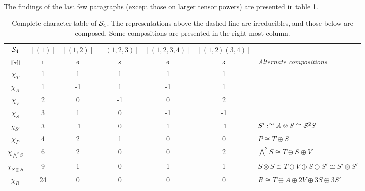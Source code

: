 \begin{example}
	\paragraph{} The findings of the last few paragraphs (except those on larger tensor powers) are presented in table \ref{table:completecharS4}.
	
	\begin{table}[hbt!]
		\centering
		\begin{tabular}{c | c c c c c | l}
			$\mathcal{S}_4$         & $[(1)]$   & $[(1,2)]$  & $[(1,2,3)]$ & $[(1,2,3,4)]$ & $[(1,2)(3,4)]$ &                                                              \\
			$\scriptstyle|[\sigma]|$    & $\scriptstyle 1$ & $\scriptstyle 6$ & $\scriptstyle 8$ & $\scriptstyle 6$  & $\scriptstyle 3$      & \textit{Alternate compositions}                              \\ \hline
			$\chi_T$       & 1       & 1       & 1       & 1        & 1            &                                                              \\
			$\chi_A$       & 1       & -1      & 1       & -1       & 1            &                                                              \\
			$\chi_V$       & 2       & 0       & -1      & 0        & 2            &                                                              \\
			$\chi_S$       & 3       & 1       & 0       & -1       & -1           &                                                              \\
			$\chi_{S'}$ & 3       & -1      & 0       & 1        & -1           & $S' :\cong A \otimes S \cong \mathcal{S}^2S$                                  \\ \hline\hline
			$\chi_P$       & 4       & 2       & 1       & 0        & 0            & $P \cong T \oplus S$                                         \\
			$\chi_{\bigwedge^2S}$    & 6       & 2       & 0       & 0        & 2            & $\bigwedge^2S \cong T \oplus S \oplus V$                     \\
			$\chi_{S \otimes S}$ & 9       & 1       & 0       & 1        & 1            & $S \otimes S \cong T \oplus V \oplus S \oplus S' \cong S' \otimes S'$ \\
			$\chi_R$       & 24      & 0       & 0       & 0        & 0            & $R \cong T \oplus A \oplus 2V \oplus 3S \oplus 3S'$
		\end{tabular}
		\caption{Complete character table of $\mathcal{S}_4$. The representations above the dashed line are irreducibles, and those below are composed. Some compositions are presented in the right-most column.}
		\label{table:completecharS4}
	\end{table}
\end{example}

